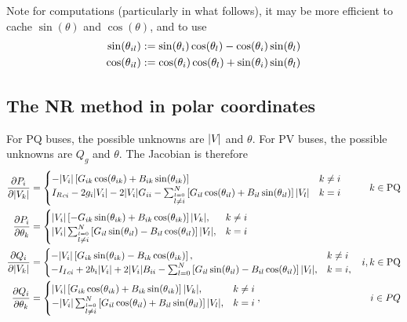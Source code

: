 \documentclass[11pt]{article}
\newcommand{\Ir}{{I_R}}
\newcommand{\Ii}{{I_I}}
\begin{document}
Note for computations (particularly in what follows), it may be more efficient to cache $\sin(\theta)$ and $\cos(\theta)$, and to use
\begin{align}
	\sin(\theta_{il}) &:= \sin(\theta_i)\cos(\theta_l) - \cos(\theta_i)\sin(\theta_l) \notag \\
	\cos(\theta_{il}) &:= \cos(\theta_i)\cos(\theta_l) + \sin(\theta_i)\sin(\theta_l)
\end{align}


\subsection{The NR method in polar coordinates}
For PQ buses, the possible unknowns are $|V_{}|$ and $\theta$. For PV buses, the possible unknowns are $Q_g$ and $\theta$. The Jacobian is therefore
\begin{align}
	\frac{\partial P_i}{\partial \M{k}} &= 
		\begin{cases}
			-\M{i}\left[G_{ik}\cs{ik} + B_{ik}\sn{ik}\right] & k \ne i \\
			\Ir_{ci} - 2g_i\M{i} - 2 \M{i}G_{ii} - \sum_{\stackrel{l = 0}{l \ne i}}^N{\left[G_{il}\cs{il} + B_{il}\sn{il}\right]\M{l}} & k = i
		\end{cases} & k \in \text{PQ} \notag \\
	\frac{\partial P_i}{\partial \theta_k} &=
		\begin{cases}
			\M{i}\left[-G_{ik}\sn{ik} + B_{ik}\cs{ik}\right]\M{k}, &k \ne i \\
			\M{i}\sum_{\stackrel{l = 0}{l \ne i}}^N{\left[G_{il}\sn{il} - B_{il}\cs{il}\right]\M{l}}, &k = i
		\end{cases} \notag \\
	\frac{\partial Q_i}{\partial \M{k}} &= 
		\begin{cases}
			-\M{i}\left[G_{ik}\sn{ik} - B_{ik}\cs{ik}\right], & k \ne i \\
			-\Ii_{ci} + 2b_i\M{i} + 2\M{i}B_{ii} - \sum_{l = 0}^N{\left[G_{il}\sn{il} - B_{il}\cs{il}\right]\M{l}}, & k = i, \\
		\end{cases} &  i, k \in \text{PQ} \notag \\
	\frac{\partial Q_i}{\partial \theta_k} &= 
		\begin{cases}
			\M{i}\left[G_{ik}\cs{ik} + B_{ik}\sn{ik}\right]\M{k}, & k \ne i \\
			-\M{i}\sum_{\stackrel{l = 0}{l \ne i}}^N{\left[G_{il}\cs{il} + B_{il}\sn{il}\right]\M{l}}, & k = i \\
		\end{cases}, & i \in PQ
\end{align}
\end{document}
